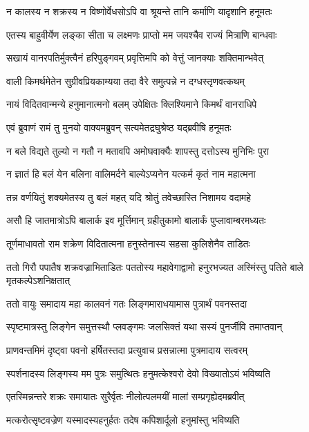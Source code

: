 \twolineshloka
{न कालस्य न शक्रस्य न विष्णोर्वेधसोऽपि वा}
{श्रूयन्ते तानि कर्माणि यादृशानि हनूमतः}%


\twolineshloka
{एतस्य बाहुवीर्येण लङ्का सीता च लक्ष्मणः}
{प्राप्तो मम जयश्चैव राज्यं मित्राणि बान्धवाः}%

\twolineshloka
{सखायं वानरपतिर्मुक्त्वैनं हरिपुङ्गवम्}
{प्रवृत्तिमपि को वेत्तुं जानक्याः शक्तिमान्भवेत्}%

\twolineshloka
{वाली किमर्थमेतेन सुग्रीवप्रियकाम्यया}
{तदा वैरे समुत्पन्ने न दग्धस्तृणवत्कथम्}%

\twolineshloka
{नायं विदितवान्मन्ये हनुमानात्मनो बलम्}
{उपेक्षितः क्लिश्यिमाने किमर्थं वानराधिपे}%

\twolineshloka
{एवं ब्रुवाणं रामं तु मुनयो वाक्यमब्रुवन्}
{सत्यमेतद्रघुश्रेष्ठ यद्ब्रवीषि हनूमतः}%

\twolineshloka
{न बले विद्यते तुल्यो न गतौ न मतावपि}
{अमोघवाक्यैः शापस्तु दत्तोऽस्य मुनिभिः पुरा}%

\twolineshloka
{न ज्ञातं हि बलं येन बलिना वालिमर्दने}
{बाल्येऽप्यनेन यत्कर्म कृतं नाम महात्मना}%

\twolineshloka
{तन्न वर्णयितुं शक्यमेतस्य तु बलं महत्}
{यदि श्रोतुं तवेच्छास्ति निशामय वदामहे}%

\twolineshloka
{असौ हि जातमात्रोऽपि बालार्क इव मूर्त्तिमान्}
{ग्रहीतुकामो बालार्कं पुप्लावाम्बरमध्यतः}%

\twolineshloka
{तूर्णमाधावतो राम शक्रेण विदितात्मना}
{हनुस्तेनास्य सहसा कुलिशेनैव ताडितः}%

\threelineshloka
{ततो गिरौ पपातैष शक्रवज्राभिताडितः}
{पततोस्य महावेगाद्वामो हनुरभज्यत}
{अस्मिंस्तु पतिते बाले मृतकल्पेऽशनिक्षतात्}%

\twolineshloka
{ततो वायुः समादाय महा कालवनं गतः}
{लिङ्गमाराधयामास पुत्रार्थं पवनस्तदा}%

\twolineshloka
{स्पृष्टमात्रस्तु लिङ्गेन समुत्तस्थौ प्लवङ्गमः}
{जलसिक्तं यथा सस्यं पुनर्जीवि तमाप्तवान्}%

\twolineshloka
{प्राणवन्तमिमं दृष्ट्वा पवनो हर्षितस्तदा}
{प्रत्युवाच प्रसन्नात्मा पुत्रमादाय सत्वरम्}%

\twolineshloka
{स्पर्शनादस्य लिङ्गस्य मम पुत्रः समुत्थितः}
{हनुमत्केश्वरो देवो विख्यातोऽयं भविष्यति}%

\twolineshloka
{एतस्मिन्नन्तरे शक्रः समायातः सुरैर्वृतः}
{नीलोत्पलमयीं मालां सम्प्रगृह्येदमब्रवीत्}%

\twolineshloka
{मत्करोत्सृष्टवज्रेण यस्मादस्यहनुर्हतः}
{तदेष कपिशार्दूलो हनुमांस्तु भविष्यति}%

